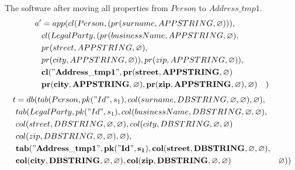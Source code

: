 \documentclass[11pt]{article}
\begin{document}
%
%
\newpage
The software after moving all properties from $Person$ to $Address\_tmp1$.
\medskip
\hline
\begin{align*}
a' &=app(cl(Person, (pr(surname, APPSTRING, \varnothing))), \\
& cl(LegalParty, (pr(businessName, APPSTRING, \varnothing), \\
& pr(street, APPSTRING, \varnothing), \\
& pr(city, APPSTRING, \varnothing)), pr(zip, APPSTRING, \varnothing)), \\
& \mathbf{cl("Address\_tmp1", pr(street, APPSTRING, \varnothing) } \\
& \mathbf{pr(city, APPSTRING, \varnothing), pr(zip, APPSTRING, \varnothing), \varnothing)}
& )
\end{align*}
\begin{align*}
t &=db(tab(Person, pk("Id", s_1), col(surname, DBSTRING, \varnothing, \varnothing), \varnothing), \\
& tab(LegalParty, pk("Id", s_1),  col(businessName, DBSTRING, \varnothing, \varnothing), \\
& col(street, DBSTRING, \varnothing, \varnothing), col(city, DBSTRING, \varnothing, \varnothing) \\
& col(zip, DBSTRING, \varnothing, \varnothing), \varnothing), \\
& \mathbf{tab("Address\_tmp1", pk("Id", s_1), col(street, DBSTRING, \varnothing, \varnothing),}\\
& \mathbf{col(city, DBSTRING, \varnothing, \varnothing), col(zip, DBSTRING, \varnothing, \varnothing)}
& \varnothing)) 
\end{align*}
\end{document}
